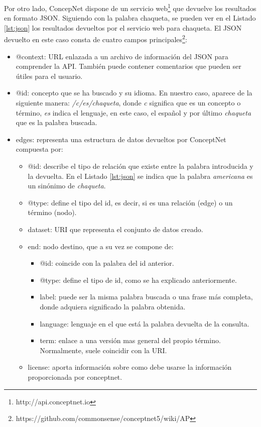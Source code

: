 Por otro lado, ConcepNet dispone de un servicio web\footnote{http://api.conceptnet.io} que devuelve los resultados en formato JSON. Siguiendo con la palabra chaqueta, se pueden ver en el Listado \ref{lst:json} los resultados devueltos por el servicio web para chaqueta. El JSON devuelto en este caso consta de cuatro campos principales\footnote{https://github.com/commonsense/conceptnet5/wiki/AP}:
\begin{itemize}
	\item @context: URL enlazada a un archivo de información del JSON para comprender la API. También puede contener comentarios que pueden ser útiles para el usuario.
	\item @id: concepto que se ha buscado y su idioma. En nuestro caso, aparece de la siguiente manera: \textit{/c/es/chaqueta}, donde  \textit{c} significa que es un concepto o término,  \textit{es} indica el lenguaje, en este caso, el español y por último \textit{chaqueta} que es la palabra buscada.
	\item edges: representa una estructura de datos devueltos por ConceptNet compuesta por:
	\begin{itemize}
		\item @id: describe el tipo de relación que existe entre la palabra introducida y la devuelta. En el Listado \ref{lst:json} se indica que la palabra \textit{americana} es un sinónimo de \textit{chaqueta}.
		\item @type: define el tipo del id, es decir, si es una relación (edge) o un término (nodo).
		\item dataset: URI que representa el conjunto de datos creado.
		\item end: nodo destino, que a su vez se compone de:	
		\begin{itemize}
			\item @id: coincide con la palabra del id anterior.
			\item @type: define el tipo de id, como se ha explicado anteriormente.
			\item label: puede ser la misma palabra buscada o una frase más completa, donde adquiera significado la palabra obtenida.
			\item language: lenguaje en el que está la palabra devuelta de la consulta.
			\item term: enlace a una versión mas general del propio término. Normalmente, suele coincidir con la URI.			
		\end{itemize}
		\item license: aporta información sobre como debe usarse la información proporcionada por conceptnet.

\end{itemize}
\end{itemize}
